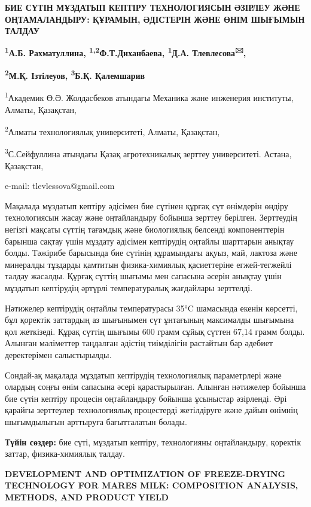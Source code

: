 {\bfseries БИЕ СҮТІН МҰЗДАТЫП КЕПТІРУ ТЕХНОЛОГИЯСЫН ӘЗІРЛЕУ ЖӘНЕ
ОҢТАМАЛАНДЫРУ: ҚҰРАМЫН, ӘДІСТЕРІН ЖӘНЕ ӨНІМ ШЫҒЫМЫН ТАЛДАУ}

{\bfseries \textsuperscript{1}А.Б. Рахматуллина,
\textsuperscript{1,2}Ф.Т.Диханбаева, \textsuperscript{1}Д.А.
Тлевлесова\textsuperscript{🖂},}

{\bfseries \textsuperscript{2}М.Қ. Ізтілеуов, \textsuperscript{3}Б.Қ.
Қалемшарив}

\textsuperscript{1}Академик Ө.Ә. Жолдасбеков атындағы Механика және
инженерия институты, Алматы, Қазақстан,

\textsuperscript{2}Алматы технологиялық университеті, Алматы, Қазақстан,

\textsuperscript{3}С.Сейфуллина атындағы Қазақ агротехникалық зерттеу
университеті. Астана, Қазақстан,

e-mail: tlevlessova@gmail.com

Мақалада мұздатып кептіру әдісімен бие сүтінен құрғақ сүт өнімдерін
өндіру технологиясын жасау және оңтайландыру бойынша зерттеу берілген.
Зерттеудің негізгі мақсаты сүттің тағамдық және биологиялық белсенді
компоненттерін барынша сақтау үшін мұздату әдісімен кептірудің оңтайлы
шарттарын анықтау болды. Тәжірибе барысында бие сүтінің құрамындағы
ақуыз, май, лактоза және минералды тұздарды қамтитын физика-химиялық
қасиеттеріне егжей-тегжейлі талдау жасалды. Құрғақ сүттің шығымы мен
сапасына әсерін анықтау үшін мұздатып кептірудің әртүрлі температуралық
жағдайлары зерттелді.

Нәтижелер кептірудің оңтайлы температурасы 35°C шамасында екенін
көрсетті, бұл қоректік заттардың аз шығынымен сүт ұнтағының максималды
шығымына қол жеткізеді. Құрақ сүттің шығымы 600 грамм сұйық сүттен 67,14
грамм болды. Алынған мәліметтер таңдалған әдістің тиімділігін растайтын
бар әдебиет деректерімен салыстырылды.

Сондай-ақ мақалада мұздатып кептірудің технологиялық параметрлері және
олардың соңғы өнім сапасына әсері қарастырылған. Алынған нәтижелер
бойынша бие сүтін кептіру процесін оңтайландыру бойынша ұсыныстар
әзірленді. Әрі қарайғы зерттеулер технологиялық процестерді жетілдіруге
және дайын өнімнің шығымдылығын арттыруға бағытталатын болады.

{\bfseries Түйін сөздер:} бие сүті, мұздатып кептіру, технологияны
оңтайландыру, қоректік заттар, физика-химиялық талдау.

{\bfseries DEVELOPMENT AND OPTIMIZATION OF FREEZE-DRYING TECHNOLOGY FOR
MARE\textquotesingle S MILK: COMPOSITION ANALYSIS, METHODS, AND PRODUCT
YIELD}

